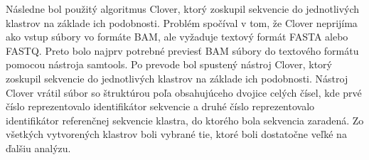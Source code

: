 Následne bol použitý algoritmus Clover, ktorý zoskupil sekvencie do jednotlivých klastrov na základe ich podobnosti.
Problém spočíval v tom, že Clover neprijíma ako vstup súbory vo formáte BAM, ale vyžaduje textový formát FASTA alebo FASTQ. Preto bolo najprv potrebné previesť BAM súbory do textového formátu pomocou nástroja samtools. %
Po prevode bol spustený nástroj Clover, ktorý zoskupil sekvencie do jednotlivých klastrov na základe ich podobnosti.
Nástroj Clover vrátil súbor so štruktúrou poľa obsahujúceho dvojice celých čísel, kde prvé číslo reprezentovalo identifikátor sekvencie a druhé číslo reprezentovalo identifikátor referenčnej sekvencie klastra, do ktorého bola sekvencia zaradená.
Zo všetkých vytvorených klastrov boli vybrané tie, ktoré boli dostatočne veľké na ďalšiu analýzu.
